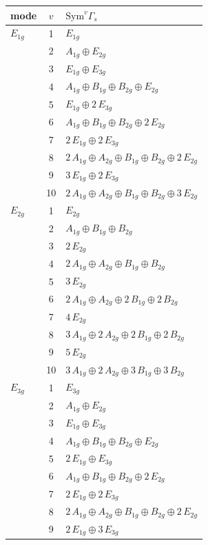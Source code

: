 \documentclass[11pt]{article}
\begin{document}
\begin{longtable}{l c p{}}
\hline mode & $v$ & $\mathrm{Sym}^v\Gamma_s$\\ \hline\endhead
$E_{1g}$ & 1 & $E_{1g}$\\
 & 2 & $A_{1g}\oplus E_{2g}$\\
 & 3 & $E_{1g}\oplus E_{3g}$\\
 & 4 & $A_{1g}\oplus B_{1g}\oplus B_{2g}\oplus E_{2g}$\\
 & 5 & $E_{1g}\oplus 2\,E_{3g}$\\
 & 6 & $A_{1g}\oplus B_{1g}\oplus B_{2g}\oplus 2\,E_{2g}$\\
 & 7 & $2\,E_{1g}\oplus 2\,E_{3g}$\\
 & 8 & $2\,A_{1g}\oplus A_{2g}\oplus B_{1g}\oplus B_{2g}\oplus 2\,E_{2g}$\\
 & 9 & $3\,E_{1g}\oplus 2\,E_{3g}$\\
 & 10 & $2\,A_{1g}\oplus A_{2g}\oplus B_{1g}\oplus B_{2g}\oplus 3\,E_{2g}$\\
\hline
$E_{2g}$ & 1 & $E_{2g}$\\
 & 2 & $A_{1g}\oplus B_{1g}\oplus B_{2g}$\\
 & 3 & $2\,E_{2g}$\\
 & 4 & $2\,A_{1g}\oplus A_{2g}\oplus B_{1g}\oplus B_{2g}$\\
 & 5 & $3\,E_{2g}$\\
 & 6 & $2\,A_{1g}\oplus A_{2g}\oplus 2\,B_{1g}\oplus 2\,B_{2g}$\\
 & 7 & $4\,E_{2g}$\\
 & 8 & $3\,A_{1g}\oplus 2\,A_{2g}\oplus 2\,B_{1g}\oplus 2\,B_{2g}$\\
 & 9 & $5\,E_{2g}$\\
 & 10 & $3\,A_{1g}\oplus 2\,A_{2g}\oplus 3\,B_{1g}\oplus 3\,B_{2g}$\\
\hline
$E_{3g}$ & 1 & $E_{3g}$\\
 & 2 & $A_{1g}\oplus E_{2g}$\\
 & 3 & $E_{1g}\oplus E_{3g}$\\
 & 4 & $A_{1g}\oplus B_{1g}\oplus B_{2g}\oplus E_{2g}$\\
 & 5 & $2\,E_{1g}\oplus E_{3g}$\\
 & 6 & $A_{1g}\oplus B_{1g}\oplus B_{2g}\oplus 2\,E_{2g}$\\
 & 7 & $2\,E_{1g}\oplus 2\,E_{3g}$\\
 & 8 & $2\,A_{1g}\oplus A_{2g}\oplus B_{1g}\oplus B_{2g}\oplus 2\,E_{2g}$\\
 & 9 & $2\,E_{1g}\oplus 3\,E_{3g}$\\

\end{longtable}
\end{document}
